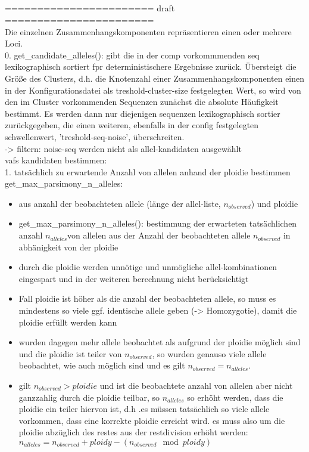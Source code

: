 \subsection{} \label{subsec:}
======================= draft =======================\\
Die einzelnen Zusammenhangskomponenten repräsentieren einen oder mehrere Loci.\\
0. get\_candidate\_alleles(): gibt die in der comp vorkommmenden seq lexikographisch sortiert fpr deterministischere Ergebnisse zurück. Übersteigt die Größe des Clusters, d.h. die Knotenzahl einer Zusammenhangskomponenten einen in der Konfigurationsdatei als treshold-cluster-size festgelegten Wert, so wird von den im Cluster vorkommenden Sequenzen zunächst die absolute Häufigkeit bestimmt. Es werden dann nur diejenigen sequenzen lexikographisch sortier zurückgegeben, die einen weiteren, ebenfalls in der config festgelegten schwellenwert, 'treshold-seq-noise', überschreiten.\\
-> filtern: noise-seq werden nicht als allel-kandidaten ausgewählt \\
vafs kandidaten bestimmen:\\
1. tatsächlich zu erwartende Anzahl von allelen anhand der ploidie bestimmen get\_max\_parsimony\_n\_alleles:
\begin{itemize}
	\item aus anzahl der beobachteten allele (länge der allel-liste, $n_{observed}$) und ploidie
	\item get\_max\_parsimony\_n\_alleles(): bestimmung der erwarteten tatsächlichen anzahl $n_{alleles}$von allelen aus der Anzahl der beobachteten allele $n_{observed}$ in abhänigkeit von der ploidie
	\item durch die ploidie werden unnötige und unmögliche allel-kombinationen   eingespart und in der weiteren berechnung nicht berücksichtigt
	\item Fall ploidie ist höher als die anzahl der beobachteten allele, so muss es mindestens so viele ggf. identische allele geben (-> Homozygotie), damit die ploidie erfüllt werden kann\\
	\item wurden dagegen mehr allele beobachtet als aufgrund der ploidie möglich sind und die ploidie ist teiler von $n_{observed}$, so wurden genauso viele allele beobachtet, wie auch möglich sind und es gilt $n_{observed} = n_{alleles}$. 
	\item gilt $n_{observed}>ploidie$ und ist die beobachtete anzahl von allelen aber nicht ganzzahlig durch die ploidie teilbar, so $n_{alleles}$ so erhöht werden, dass die ploidie ein teiler hiervon ist, d.h .es müssen tatsächlich so viele allele vorkommen, dass eine korrekte ploidie erreicht wird. es muss also um die ploidie abzüglich des restes aus der restdivision erhöht werden: $ n_{alleles} = n_{observed} + ploidy - (n_{observed} \mod ploidy)$
\end{itemize}

